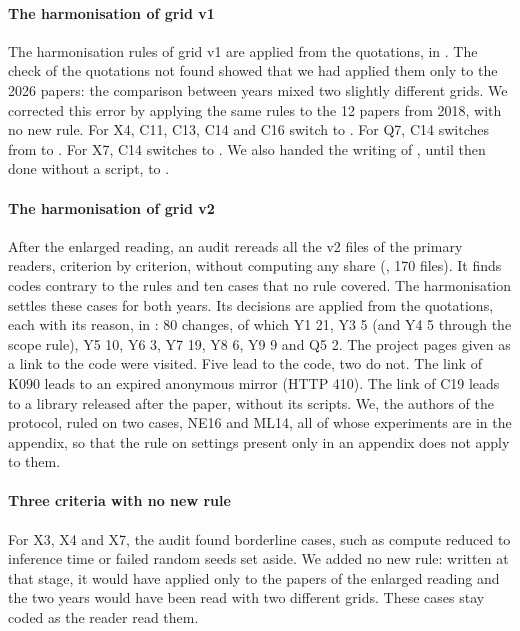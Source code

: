 \paragraph{The harmonisation of grid v1}
The harmonisation rules of grid v1 are applied from the quotations, in .
The check of the quotations not found showed that we had applied them only to the 2026 papers: the
comparison between years mixed two slightly different grids. We corrected this error by applying the
same rules to the 12 papers from 2018, with no new rule. For X4, C11, C13, C14 and C16 switch to
. For Q7, C14 switches from  to . For X7, C14 switches to . We
also handed the writing of , until then done without a script, to
.

\paragraph{The harmonisation of grid v2}
After the enlarged reading, an audit rereads all the v2 files of the primary readers, criterion by
criterion, without computing any share (, 170 files). It finds
codes contrary to the rules and ten cases that no rule covered. The harmonisation settles these
cases for both years. Its decisions are applied from the
quotations, each with its reason, in : 80 changes, of which Y1 21, Y3 5
(and Y4 5 through the scope rule), Y5 10, Y6 3, Y7 19, Y8 6, Y9 9 and Q5 2. The project pages given as
a link to the code were visited. Five lead to the code, two do not. The link of K090
leads to an expired anonymous mirror (HTTP 410). The link of C19 leads to a library released after the
paper, without its scripts. We, the authors of the protocol, ruled on two cases, NE16 and ML14, all of whose
experiments are in the appendix, so that the rule on settings present only in an appendix does not
apply to them.

\paragraph{Three criteria with no new rule}
For X3, X4 and X7, the audit found borderline cases, such as compute reduced to inference time or
failed random seeds set aside. We added no new rule: written at that stage, it would have applied only to
the papers of the enlarged reading and the two years would have been read with two different grids. These cases stay coded as the reader read them.

